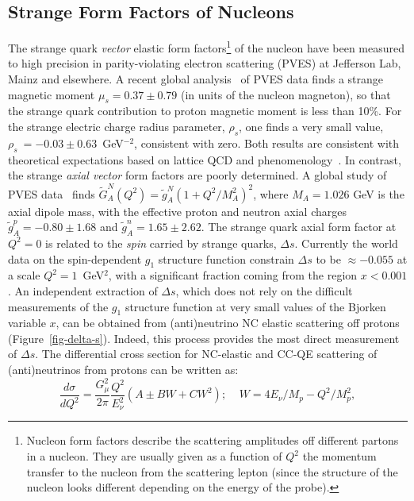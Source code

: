 \subsection{Strange Form Factors of Nucleons}
The strange quark \emph{vector} elastic form factors\footnote{Nucleon form factors describe the scattering amplitudes off
different partons in a nucleon. They are usually given as a function of
$Q^2$ the momentum transfer to the nucleon from the scattering lepton
(since the structure of the nucleon looks different depending on the
energy of the probe).}
 of the nucleon have been
measured to high precision in parity-violating electron scattering
(PVES) at Jefferson Lab, Mainz and elsewhere.
A recent global analysis~\cite{Young:2006jc} 
of PVES data finds a strange 
magnetic moment $\mu_s = 0.37 \pm 0.79$ (in units of the nucleon
magneton), so that the strange quark contribution to proton magnetic
moment is less than 10\%.
%
For the strange electric charge radius parameter, $\rho_s$, one finds a very
small value, $\rho_s\ = -0.03 \pm 0.63$~GeV$^{-2}$, consistent with zero. 
Both  results are consistent with theoretical expectations
based on lattice QCD and phenomenology~\cite{Leinweber:2004tc}.
In contrast, the strange \emph{axial vector} form factors are poorly 
determined.  A global study of PVES data~\cite{Young:2006jc} 
finds
%
$\widetilde{G}_A^N(Q^2)
= \widetilde{g}_A^N \left( 1 + {Q^2 / M_A^2} \right)^2$,
%
where $M_A = 1.026 $ GeV is the axial dipole mass, with the
effective proton and neutron axial charges 
$\widetilde{g}_A^p = -0.80 \pm 1.68$ and 
$\widetilde{g}_A^n = 1.65 \pm 2.62$.
The strange quark axial form factor at $Q^2=0$ is related to the
\emph{spin} carried by strange quarks, $\Delta s$.
Currently the world data on the spin-dependent $g_1$ structure function
constrain $\Delta s$ to be $\approx -0.055$ at a scale $Q^2=1$~GeV$^2$,
with a significant fraction coming from the region $x < 0.001$. 
An independent extraction of $\Delta s$, which does not rely on the difficult
measurements of the $g_1$ structure function at very small values of the Bjorken variable $x$, can be obtained from (anti)neutrino NC elastic scattering off protons 
 (Figure~\ref{fig-delta-s}). Indeed, 
this process provides the most direct measurement of $\Delta s$.
The differential cross section for NC-elastic and CC-QE scattering of
(anti)neutrinos from protons can be written as:
\begin{equation} \label{eqn:QE}
\frac{d \sigma}{d Q^2} = \frac{G_\mu^2}{2\pi} \frac{Q^2}{E_\nu^2} \left( A \pm BW + C W^2 \right); \;\;\;\;  W=4E_\nu/M_p - Q^2/M_p^2,
\end{equation}
